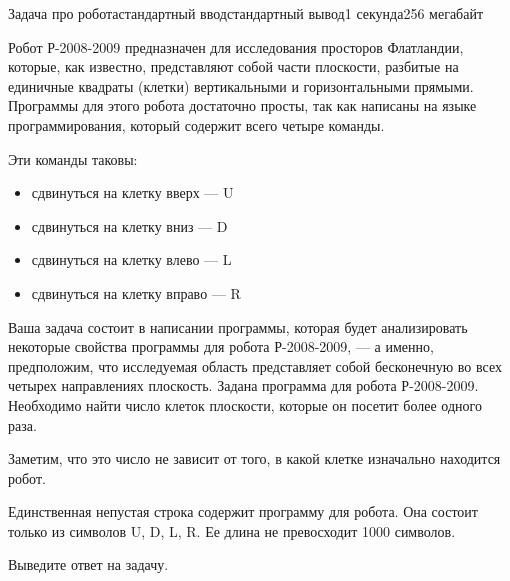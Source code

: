 \begin{problem}{Задача про робота}{стандартный ввод}{стандартный вывод}{1 секунда}{256 мегабайт}

Робот Р-2008-2009 предназначен для исследования просторов Флатландии, которые, как известно, представляют собой части плоскости, разбитые на единичные квадраты (клетки) вертикальными и горизонтальными прямыми. Программы для этого робота достаточно просты, так как написаны
на языке программирования, который содержит всего четыре команды.

Эти команды таковы:
\begin{itemize}
\item сдвинуться на клетку вверх --- U
\item сдвинуться на клетку вниз --- D
\item сдвинуться на клетку влево --- L
\item сдвинуться на клетку вправо --- R
\end{itemize}

Ваша задача состоит в написании программы, которая будет анализировать некоторые свойства
программы для робота Р-2008-2009, --- а именно, предположим, что исследуемая область 
представляет собой бесконечную во всех четырех направлениях плоскость. Задана программа для робота
Р-2008-2009. Необходимо найти число клеток плоскости, которые он посетит более одного раза.

Заметим, что это число не зависит от того, в какой клетке изначально находится робот.


\InputFile
Единственная непустая строка содержит программу для робота. Она состоит только из символов
U, D, L, R. Ее длина не превосходит 1000 символов.


\OutputFile
Выведите ответ на задачу.


\Examples

\begin{example}
%
%
\end{example}

\end{problem}

